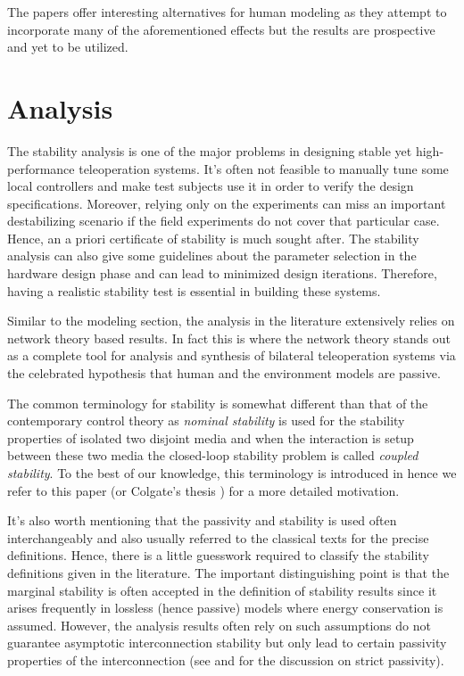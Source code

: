 The papers \cite{leelee,prekopiou} offer interesting alternatives for human modeling as they attempt to incorporate 
many of the aforementioned effects but the results are prospective and yet to be utilized. 



\section{Analysis}\label{sec:litchapanalysis}

The stability analysis is one of the major problems in designing stable yet high-performance teleoperation 
systems. It's often not feasible to manually tune some local controllers and make test subjects use it in order to verify the
design specifications. Moreover, relying only on the experiments can miss an important destabilizing scenario if the field 
experiments do not cover that particular case. Hence, an a priori certificate of stability is much sought after. The stability 
analysis can also give some guidelines about the parameter selection in the hardware design phase and can lead to minimized 
design iterations. Therefore, having a realistic stability test is essential in building these systems. 

Similar to the modeling section, the analysis in the literature extensively relies on network theory based results. In fact 
this is where the network theory stands out as a complete tool for analysis and synthesis of bilateral teleoperation systems
via the celebrated hypothesis that human and the environment models are passive.  

The common terminology for stability is somewhat different than that of the contemporary control theory as \emph{nominal stability} 
is used for the stability properties of isolated two disjoint media and when the interaction is setup between these two media the closed-loop 
stability problem is called \emph{coupled stability}. To the best of our knowledge, this terminology is introduced in 
\cite{colgatehogan88} hence we refer to this paper (or Colgate's thesis \cite{colgatephd}) for a more detailed motivation. 


It's also worth mentioning that the passivity and stability is used often interchangeably and also usually referred to the classical texts
\cite{haykin,mitra69,chen91} for the precise definitions. Hence, there is a little guesswork required to classify the stability definitions given in the
literature. The important distinguishing point is that the marginal stability is often accepted in the definition of stability results since
it arises frequently in lossless (hence passive) models where energy conservation is assumed. However, the analysis results often 
rely on such assumptions do not guarantee asymptotic interconnection stability but only lead to certain passivity 
properties of the interconnection (see \cite[Thm. 6.1]{khalil} and \cite[Sec. V]{lawrence} for the discussion on strict passivity).  

